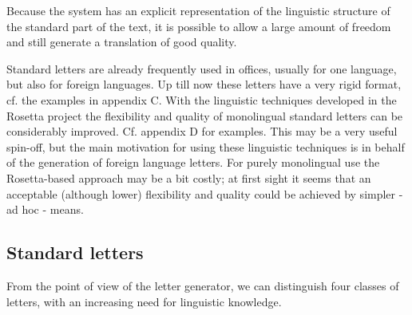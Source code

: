 \begin{itemize}
Because
 the system has an explicit 
representation of the linguistic structure of the standard part of the 
text, it is possible to 
allow a large amount of freedom and still generate a translation of good
quality.


\bigskip

Standard letters are already  frequently used in offices, usually for one 
language, but also for foreign languages. Up till now these letters have 
a very rigid format, cf. the examples in appendix C. 
With the linguistic techniques developed in the Rosetta project 
 the flexibility and quality of monolingual 
standard letters can be 
considerably improved. Cf. appendix D for examples.
This may be a very useful spin-off, but the main motivation for 
using these linguistic techniques is in behalf of the generation of 
foreign language letters. 
For purely monolingual use the Rosetta-based 
approach may be a bit costly; at first sight it seems that
 an acceptable (although lower) flexibility and quality
could be achieved by simpler - ad hoc - means.



\end{itemize}


\subsection{Standard letters}

From the point of view of the letter generator, 
we can distinguish four classes of letters, with an increasing need
for linguistic knowledge. 


